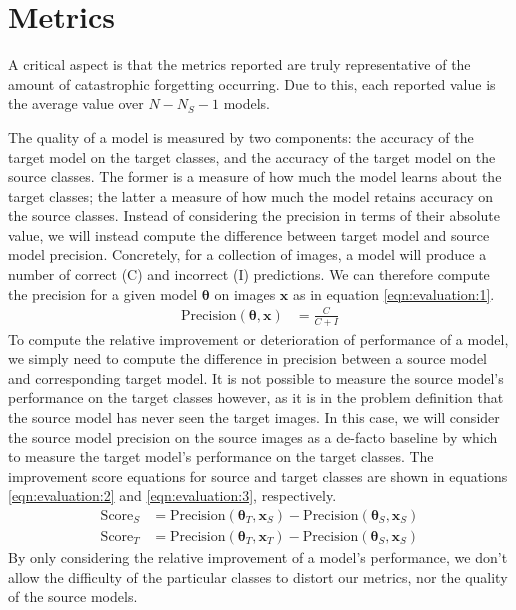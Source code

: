 \documentclass{report}
\begin{document}
	\section{Metrics}
	A critical aspect is that the metrics reported are truly representative of the amount of catastrophic forgetting occurring. Due to this, each reported value is the average value over $N-N_S-1$ models. \par
	The quality of a model is measured by two components: the accuracy of the target model on the target classes, and the accuracy of the target model on the source classes. The former is a measure of how much the model learns about the target classes; the latter a measure of how much the model retains accuracy on the source classes. Instead of considering the precision in terms of their absolute value, we will instead compute the difference between target model and source model precision. Concretely, for a collection of images, a model will produce a number of correct (C) and incorrect (I) predictions. We can therefore compute the precision for a given model $\bm{\theta}$ on images $\bm{x}$ as in equation \ref{eqn:evaluation:1}.
	\begin{align} \label{eqn:evaluation:1}
	\text{Precision}(\bm{\theta}, \bm{x}) &= \frac{C}{C+I}
	\end{align}
	To compute the relative improvement or deterioration of performance of a model, we simply need to compute the difference in precision between a source model and corresponding target model. It is not possible to measure the source model's performance on the target classes however, as it is in the problem definition that the source model has never seen the target images. In this case, we will consider the source model precision on the source images as a de-facto baseline by which to measure the target model's performance on the target classes. The improvement score equations for source and target classes are shown in equations \ref{eqn:evaluation:2} and \ref{eqn:evaluation:3}, respectively.
	\begin{align} \label{eqn:evaluation:2}
	\text{Score}_S &= \text{Precision}(\bm{\theta}_T, \bm{x}_S) - \text{Precision}(\bm{\theta}_S, \bm{x}_S) \\
	\label{eqn:evaluation:3}
	\text{Score}_T &= \text{Precision}(\bm{\theta}_T, \bm{x}_T) - \text{Precision}(\bm{\theta}_S, \bm{x}_S)
	\end{align}
	By only considering the relative improvement of a model's performance, we don't allow the difficulty of the particular classes to distort our metrics, nor the quality of the source models.
	
\end{document}
